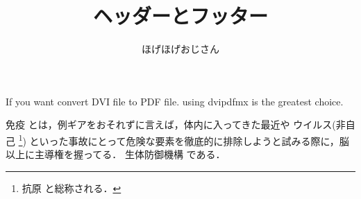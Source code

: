 \documentclass[a4paper, 11pt, uplatex]{jsarticle}
\begin{document}
\title{ヘッダーとフッター}
\author{ほげほげおじさん}
\maketitle


If you want convert DVI file to PDF file.
using dvipdfmx  is the greatest choice.

免疫 とは，例ギアをおそれずに言えば，体内に入ってきた最近や
ウイルス(非自己  \footnote{抗原 と総称される．})
といった事故にとって危険な要素を徹底的に排除しようと試みる際に，脳以上に主導権を握ってる．
生体防御機構 である．


\printindex


\nocite{*}

\end{document}
